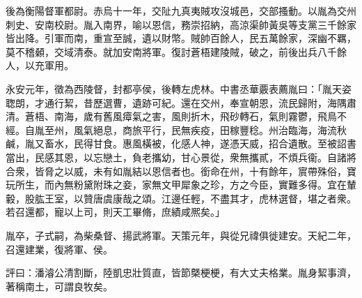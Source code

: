 \begin{pinyinscope}
後為衡陽督軍都尉。赤烏十一年，交阯九真夷賊攻沒城邑，交部搔動。以胤為交州刺史、安南校尉。胤入南界，喻以恩信，務崇招納，高涼渠帥黃吳等支黨三千餘家皆出降。引軍而南，重宣至誠，遺以財幣。賊帥百餘人，民五萬餘家，深幽不羈，莫不稽顙，交域清泰。就加安南將軍。復討蒼梧建陵賊，破之，前後出兵八千餘人，以充軍用。

永安元年，徵為西陵督，封都亭侯，後轉左虎林。中書丞華覈表薦胤曰：「胤天姿聦朗，才通行絜，昔歷選曹，遺跡可紀。還在交州，奉宣朝恩，流民歸附，海隅肅清。蒼梧、南海，歲有舊風瘴氣之害，風則折木，飛砂轉石，氣則霧鬱，飛鳥不經。自胤至州，風氣絕息，商旅平行，民無疾疫，田稼豐稔。州治臨海，海流秋鹹，胤又畜水，民得甘食。惠風橫被，化感人神，遂憑天威，招合遺散。至被詔書當出，民感其恩，以忘戀土，負老攜幼，甘心景從，衆無攜貳，不煩兵衞。自諸將合衆，皆脅之以威，未有如胤結以恩信者也。銜命在州，十有餘年，賔帶殊俗，寶玩所生，而內無粉黛附珠之妾，家無文甲犀象之珍，方之今臣，實難多得。宜在輦轂，股肱王室，以贊唐虞康哉之頌。江邊任輕，不盡其才，虎林選督，堪之者衆。若召還都，寵以上司，則天工畢脩，庶績咸熈矣。」

胤卒，子式嗣，為柴桑督、揚武將軍。天策元年，與從兄禕俱徙建安。天紀二年，召還建業，復將軍、侯。

評曰：潘濬公清割斷，陸凱忠壯質直，皆節槩梗梗，有大丈夫格業。胤身絜事濟，著稱南土，可謂良牧矣。


\end{pinyinscope}